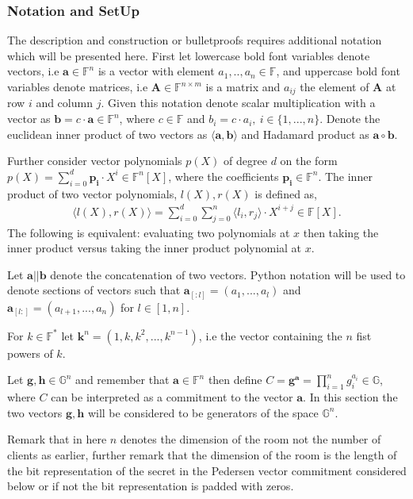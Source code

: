 \subsubsection*{Notation and SetUp}
The description and construction or bulletproofs requires additional notation which will be presented here. First let lowercase bold font variables denote vectors, i.e $\mathbf{a}\in\mathds{F}^n$ is a vector with element $a_1,..,a_n \in \mathds{F}$, and uppercase bold font variables denote matrices, i.e $\mathbf{A}\in\mathds{F}^{n\times m}$ is a matrix and $a_{ij}$ the element of $\mathbf{A}$ at row $i$ and column $j$. Given this notation denote scalar multiplication with a vector as $\mathbf{b}=c\cdot \mathbf{a}\in\mathds{F}^n$, where $c\in\mathds{F}$ and  $b_i=c\cdot a_i, \: i\in\{1,...,n\}$. Denote the euclidean inner product of two vectors as $\langle \mathbf{a},\mathbf{b}\rangle$ and Hadamard product as $\mathbf{a}\circ \mathbf{b}$.

Further consider vector polynomials $p(X)$ of degree $d$ on the form $p(X)=\sum_{i=0}^d \mathbf{p_i}\cdot X^i\in\mathds{F}^n[X]$, where the coefficients $\mathbf{p_i}\in\mathds{F}^n$. The inner product of two vector polynomials, $l(X),r(X)$ is defined as, 
\begin{align*}
    \langle l(X),r(X)\rangle = \sum_{i=0}^d\sum_{j=0}^n \langle l_i,r_j\rangle \cdot X^{i+j}\in\mathds{F}[X].
\end{align*}
The following is equivalent: evaluating two polynomials at $x$ then taking the inner product versus taking the inner product polynomial at $x$.

Let $\mathbf{a}||\mathbf{b}$ denote the concatenation of two vectors. Python notation will be used to denote sections of vectors such that $\mathbf{a}_{[:l]} = (a_1,...,a_l)$ and $\mathbf{a}_{[l:]} = (a_{l+1},...,a_n)$ for $l\in[1,n]$. 

For $k\in\mathds{F}^*$ let $\mathbf{k}^n=(1,k,k^2,...,k^{n-1})$, i.e the vector containing the $n$ fist powers of $k$. 

Let $\mathbf{g},\mathbf{h}\in\mathds{G}^n$ and remember that $\mathbf{a}\in\mathds{F}^n$ then define $C= \mathbf{g}^\mathbf{a} = \prod_{i=1}^ng_i^{a_i}\in\mathds{G}$, where $C$ can be interpreted as a commitment to the vector $\mathbf{a}$. In this section the two vectors $\mathbf{g},\mathbf{h}$ will be considered to be generators of the space $\mathds{G}^n$.

Remark that in here $n$ denotes the dimension of the room not the number of clients as earlier, further remark that the dimension of the room is the length of the bit representation of the secret in the Pedersen vector commitment considered below or if not the bit representation is padded with zeros.

